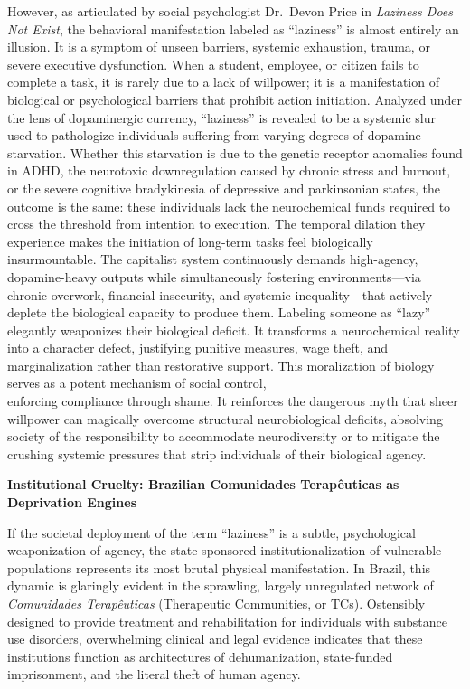 However, as articulated by social psychologist Dr.~Devon Price in \emph{Laziness Does Not Exist}, the behavioral manifestation labeled as ``laziness'' is almost entirely an illusion. It is a symptom of unseen barriers, systemic exhaustion, trauma, or severe executive dysfunction. When a student, employee, or citizen fails to complete a task, it is rarely due to a lack of willpower; it is a manifestation of biological or psychological barriers that prohibit action initiation. Analyzed under the lens of dopaminergic currency, ``laziness'' is revealed to be a systemic slur used to pathologize individuals suffering from varying degrees of dopamine starvation. Whether this starvation is due to the genetic receptor anomalies found in ADHD, the neurotoxic downregulation caused by chronic stress and burnout, or the severe cognitive bradykinesia of depressive and parkinsonian states, the outcome is the same: these individuals lack the neurochemical funds required to cross the threshold from intention to execution. The temporal dilation they experience makes the initiation of long-term tasks feel biologically insurmountable. The capitalist system continuously demands high-agency, dopamine-heavy outputs while simultaneously fostering environments---via chronic overwork, financial insecurity, and systemic inequality---that actively deplete the biological capacity to produce them. Labeling someone as ``lazy'' elegantly weaponizes their biological deficit. It transforms a neurochemical reality into a character defect, justifying punitive measures, wage theft, and marginalization rather than restorative support. This moralization of biology serves as a potent mechanism of social control,\\
enforcing compliance through shame. It reinforces the dangerous myth that sheer willpower can magically overcome structural neurobiological deficits, absolving society of the responsibility to accommodate neurodiversity or to mitigate the crushing systemic pressures that strip individuals of their biological agency.

\textbf{Institutional Cruelty: Brazilian Comunidades Terapêuticas as Deprivation Engines}

If the societal deployment of the term ``laziness'' is a subtle, psychological weaponization of agency, the state-sponsored institutionalization of vulnerable populations represents its most brutal physical manifestation. In Brazil, this dynamic is glaringly evident in the sprawling, largely unregulated network of \emph{Comunidades Terapêuticas} (Therapeutic Communities, or TCs). Ostensibly designed to provide treatment and rehabilitation for individuals with substance use disorders, overwhelming clinical and legal evidence indicates that these institutions function as architectures of dehumanization, state-funded imprisonment, and the literal theft of human agency.

